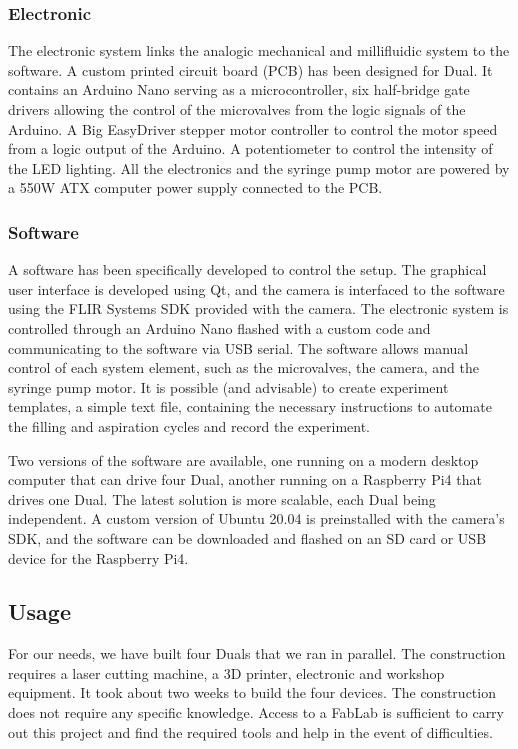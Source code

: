   \subsubsection{Electronic}
  The electronic system links the analogic mechanical and millifluidic system to the software. A custom printed circuit board (PCB) has been designed for Dual. It contains an Arduino Nano serving as a microcontroller, six half-bridge gate drivers allowing the control of the microvalves from the logic signals of the Arduino. A Big EasyDriver stepper motor controller to control the motor speed from a logic output of the Arduino. A potentiometer to control the intensity of the LED lighting. All the electronics and the syringe pump motor are powered by a 550W ATX computer power supply connected to the PCB.

  \subsubsection{Software}
  A software has been specifically developed to control the setup. The graphical user interface is developed using Qt, and the camera is interfaced to the software using the FLIR Systems SDK \url{} provided with the camera. The electronic system is controlled through an Arduino Nano flashed with a custom code \url{} and communicating to the software via USB serial. The software allows manual control of each system element, such as the microvalves, the camera, and the syringe pump motor. It is possible (and advisable) to create experiment templates, a simple text file, containing the necessary instructions to automate the filling and aspiration cycles and record the experiment.

  Two versions of the software are available, one running on a modern desktop computer that can drive four Dual, another running on a Raspberry Pi4 that drives one Dual. The latest solution is more scalable, each Dual being independent. A custom version of Ubuntu 20.04 is preinstalled with the camera's SDK, and the software can be downloaded \url{} and flashed on an SD card or USB device for the Raspberry Pi4.

  \subsection{Usage}
  For our needs, we have built four Duals that we ran in parallel. The construction requires a laser cutting machine, a 3D printer, electronic and workshop equipment. It took about two weeks to build the four devices. The construction does not require any specific knowledge. Access to a FabLab is sufficient to carry out this project and find the required tools and help in the event of difficulties.

